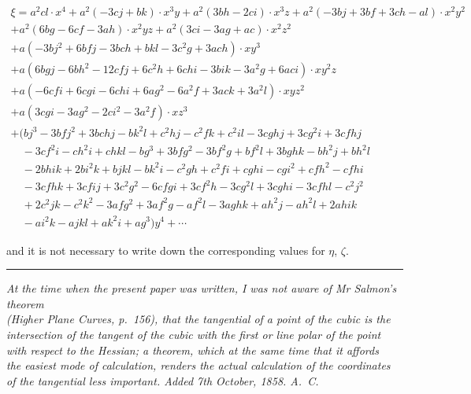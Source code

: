 \documentclass[11pt,a4paper]{book}
\begin{document}
\begin{center}
\small
\begin{multline*}
\xi = a^2cl\cdot x^4 + a^2(-3cj+bk)\cdot x^3y + a^2(3bh-2ci)\cdot x^3z + a^2(-3bj+3bf+3ch-al)\cdot x^2y^2 \\
+ a^2(6bg-6cf-3ah)\cdot x^2yz + a^2(3ci-3ag+ac)\cdot x^2z^2 \\
+ a(-3bj^2+6bfj-3bch+bkl-3c^2g+3ach)\cdot xy^3 \\
+ a(6bgj-6bh^2-12cfj+6c^2h+6chi-3bik-3a^2g+6aci)\cdot xy^2z \\
+ a(-6cfi+6cgi-6chi+6ag^2-6a^2f+3ack+3a^2l)\cdot xyz^2 \\
+ a(3cgi-3ag^2-2ci^2-3a^2f)\cdot xz^3 \\
+ (bj^3-3bfj^2+3bchj-bk^2l+c^2hj-c^2fk+c^2il-3cghj+3cg^2i+3cfhj \\
\quad -3cf^2i-ch^2i+chkl-bg^3+3bfg^2-3bf^2g+bf^2l+3bghk-bh^2j+bh^2l \\
\quad -2bhik+2bi^2k+bjkl-bk^2i-c^2gh+c^2fi+cghi-cgi^2+cfh^2-cfhi \\
\quad -3cfhk+3cfij+3c^2g^2-6cfgi+3cf^2h-3cg^2l+3cghi-3cfhl-c^2j^2 \\
\quad +2c^2jk-c^2k^2-3afg^2+3af^2g-af^2l-3aghk+ah^2j-ah^2l+2ahik \\
\quad -ai^2k-ajkl+ak^2i+ag^3\bigr)y^4 + \cdots
\end{multline*}
\normalsize

and it is not necessary to write down the corresponding values for $\eta$, $\zeta$.

\vspace{1em}
\noindent\rule{0.3\textwidth}{0.4pt}
\begin{flushright}
\textit{At the time when the present paper was written, I was not aware of Mr Salmon's theorem}\\
\textit{(Higher Plane Curves, p.~156), that the tangential of a point of the cubic is the}\\
\textit{intersection of the tangent of the cubic with the first or line polar of the point}\\
\textit{with respect to the Hessian; a theorem, which at the same time that it affords}\\
\textit{the easiest mode of calculation, renders the actual calculation of the coordinates}\\
\textit{of the tangential less important. Added 7th October, 1858. A.~C.}
\end{flushright}

\newpage


\end{center}
\end{document}
